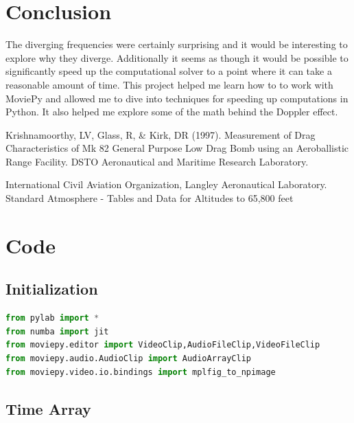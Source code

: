 \documentclass[%
 reprint,
 amsmath,amssymb,
 aps,
]{revtex4-1}
\begin{document}
\section{\label{sec:conclusion}Conclusion}

The diverging frequencies were certainly surprising and it would be interesting to explore why they diverge. Additionally it seems as though it would be possible to significantly speed up the computational solver to a point where it can take a reasonable amount of time. This project helped me learn how to to work with MoviePy and allowed me to dive into techniques for speeding up computations in Python. It also helped me explore some of the math behind the Doppler effect.


\begin{thebibliography}{100}

 Krishnamoorthy, LV, Glass, R, \& Kirk, DR (1997). Measurement of Drag Characteristics of Mk 82 General Purpose Low Drag Bomb using an Aeroballistic Range Facility. DSTO Aeronautical and Maritime Research Laboratory.

 International Civil Aviation Organization, Langley Aeronautical Laboratory. Standard Atmosphere - Tables and Data for Altitudes to 65,800 feet

\end{thebibliography}

\clearpage

\onecolumngrid
\appendix
\section{\label{sec:code}Code}

\subsection{\label{sec:codeinit}Initialization}

\begin{lstlisting}[label=lst:init,language=Python]
from pylab import *
from numba import jit
from moviepy.editor import VideoClip,AudioFileClip,VideoFileClip
from moviepy.audio.AudioClip import AudioArrayClip
from moviepy.video.io.bindings import mplfig_to_npimage
\end{lstlisting}

\subsection{\label{sec:codetimearr}Time Array}
\end{document}
